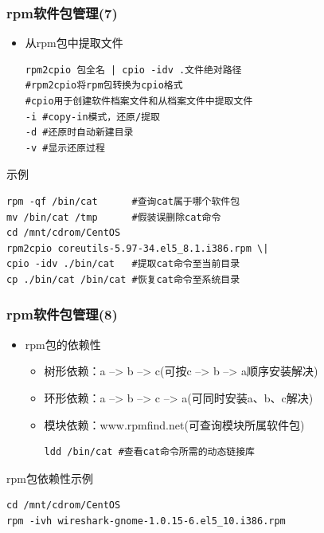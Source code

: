 \documentclass[xcolor=svgnames,presentation]{beamer}
\begin{document}
\begin{frame}[fragile]
\frametitle{rpm软件包管理(7)}
\label{sec-3-7}
\begin{itemize}

\item 从rpm包中提取文件\\
\label{sec-3-7-1}%
\begin{verbatim}
rpm2cpio 包全名 | cpio -idv .文件绝对路径
#rpm2cpio将rpm包转换为cpio格式
#cpio用于创建软件档案文件和从档案文件中提取文件
-i #copy-in模式，还原/提取
-d #还原时自动新建目录
-v #显示还原过程
\end{verbatim}
\end{itemize} %
\begin{exampleblock}{示例}
\label{sec-3-7-2}


\begin{verbatim}
rpm -qf /bin/cat      #查询cat属于哪个软件包
mv /bin/cat /tmp      #假装误删除cat命令
cd /mnt/cdrom/CentOS
rpm2cpio coreutils-5.97-34.el5_8.1.i386.rpm \|
cpio -idv ./bin/cat   #提取cat命令至当前目录
cp ./bin/cat /bin/cat #恢复cat命令至系统目录
\end{verbatim}
\end{exampleblock}
\end{frame}
\begin{frame}[fragile]
\frametitle{rpm软件包管理(8)}
\label{sec-3-8}
\begin{itemize}

\item rpm包的依赖性
\label{sec-3-8-1}%
\begin{itemize}

\item 树形依赖：a --> b --> c(可按c --> b --> a顺序安装解决)
\label{sec-3-8-1-1}%

\item 环形依赖：a --> b --> c --> a(可同时安装a、b、c解决)
\label{sec-3-8-1-2}%

\item 模块依赖：www.rpmfind.net(可查询模块所属软件包)\\
\label{sec-3-8-1-3}%
\begin{verbatim}
ldd /bin/cat #查看cat命令所需的动态链接库
\end{verbatim}
\end{itemize} %
\end{itemize} %
\begin{exampleblock}{rpm包依赖性示例}
\label{sec-3-8-2}


\begin{verbatim}
cd /mnt/cdrom/CentOS
rpm -ivh wireshark-gnome-1.0.15-6.el5_10.i386.rpm
\end{verbatim}
\end{exampleblock}
\end{frame}
\end{document}
